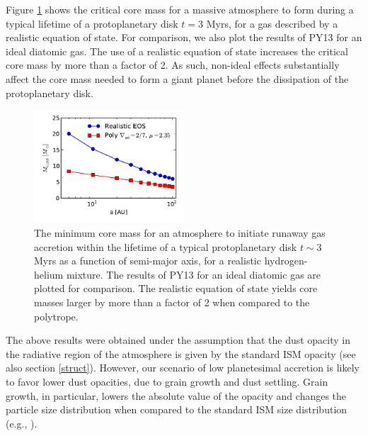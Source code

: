 \documentclass[apj]{emulateapj}
\begin{document}


Figure \ref{fig:Mvsaplot} shows the critical core mass for a massive atmosphere to form during a typical lifetime of a protoplanetary disk $t=3$ Myrs, for a gas described by a realistic equation of state. For comparison, we also plot the results of PY13 for an ideal diatomic gas. The use of a realistic equation of state increases the critical core mass by more than a factor of 2. As such, non-ideal effects substantially affect the core mass needed to form a giant planet  before the dissipation of the protoplanetary disk.   

\begin{figure}[h!]
\centering
\includegraphics[width=0.5\textwidth]{../../figs/ModelAtmospheres/RadSelfGravRealEOS/PaperFigs/Mc_vs_a_poly_real_paper.pdf}
\caption{The minimum core mass for an atmosphere to initiate runaway gas accretion within the lifetime of a typical protoplanetary disk $t \sim 3$ Myrs as a function of semi-major axis, for a realistic hydrogen-helium mixture. The results of PY13 for an ideal diatomic gas are plotted for comparison. The realistic equation of state yields core masses larger by more than a factor of 2 when compared to the polytrope.}
\label{fig:Mvsaplot}
\end{figure}

The above results were obtained under the assumption that the dust opacity in the radiative region of the atmosphere is given by the standard ISM opacity (see also section \ref{struct}). However, our scenario of low planetesimal accretion is likely to favor lower dust opacities, due to grain growth and dust settling. Grain growth, in particular, lowers the absolute value of the opacity and changes the particle size distribution when compared to the standard ISM size distribution (e.g., \citealt{pollack85}).
\end{document}

